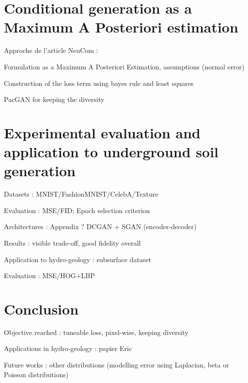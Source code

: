 \section{Conditional generation as a Maximum A Posteriori estimation}
Approche de l'article NeuCom :

Formulation as a Maximum A Posteriori Estimation, assumptions (normal error)

Construction of the loss term using bayes rule and least squares 

PacGAN for keeping the diversity

\section{Experimental evaluation and application to underground soil generation}

Datasets : MNIST/FashionMNIST/CelebA/Texture

Evaluation : MSE/FID; Epoch  selection criterion

Architectures : Appendix ? DCGAN + SGAN (encoder-decoder)

Results : visible trade-off, good fidelity overall

Application to hydro-geology : subsurface dataset

Evaluation : MSE/HOG+LBP

\section{Conclusion}

Objective reached : tuneable loss, pixel-wise, keeping diversity

Applications in hydro-geology : papier Eric

Future works : other distributions (modelling error using Laplacian, beta or Poisson distributions)
